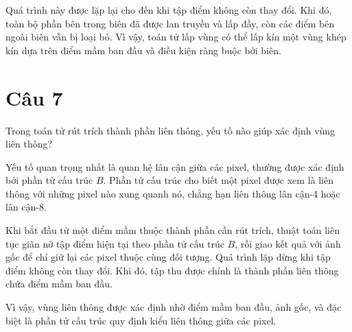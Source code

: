 Quá trình này được lặp lại cho đến khi tập điểm không còn thay đổi. Khi đó, toàn bộ phần bên trong biên đã được lan truyền và lấp đầy, còn các điểm bên ngoài biên vẫn bị loại bỏ. Vì vậy, toán tử lấp vùng có thể lấp kín một vùng khép kín dựa trên điểm mầm ban đầu và điều kiện ràng buộc bởi biên.

\section*{Câu 7}
Trong toán tử rút trích thành phần liên thông, yếu tố nào giúp xác định vùng liên thông?

Yếu tố quan trọng nhất là quan hệ lân cận giữa các pixel, thường được xác định bởi phần tử cấu trúc $B$. Phần tử cấu trúc cho biết một pixel được xem là liên thông với những pixel nào xung quanh nó, chẳng hạn liên thông lân cận-4 hoặc lân cận-8.

Khi bắt đầu từ một điểm mầm thuộc thành phần cần rút trích, thuật toán liên tục giãn nở tập điểm hiện tại theo phần tử cấu trúc $B$, rồi giao kết quả với ảnh gốc để chỉ giữ lại các pixel thuộc cùng đối tượng. Quá trình lặp dừng khi tập điểm không còn thay đổi. Khi đó, tập thu được chính là thành phần liên thông chứa điểm mầm ban đầu.

Vì vậy, vùng liên thông được xác định nhờ điểm mầm ban đầu, ảnh gốc, và đặc biệt là phần tử cấu trúc quy định kiểu liên thông giữa các pixel.
